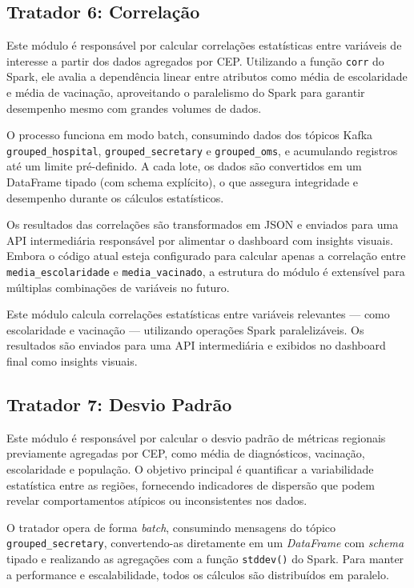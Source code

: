 \documentclass[a4paper,12pt]{article}
\begin{document}
\subsection{Tratador 6: Correlação}

Este módulo é responsável por calcular correlações estatísticas entre variáveis de interesse a partir dos dados agregados por CEP. Utilizando a função \texttt{corr} do Spark, ele avalia a dependência linear entre atributos como média de escolaridade e média de vacinação, aproveitando o paralelismo do Spark para garantir desempenho mesmo com grandes volumes de dados.

O processo funciona em modo batch, consumindo dados dos tópicos Kafka \\ \texttt{grouped\_hospital}, \texttt{grouped\_secretary} e \texttt{grouped\_oms}, e acumulando registros até um limite pré-definido. A cada lote, os dados são convertidos em um DataFrame tipado (com schema explícito), o que assegura integridade e desempenho durante os cálculos estatísticos.

Os resultados das correlações são transformados em JSON e enviados para uma API intermediária responsável por alimentar o dashboard com insights visuais. Embora o código atual esteja configurado para calcular apenas a correlação entre \texttt{media\_escolaridade} e \texttt{media\_vacinado}, a estrutura do módulo é extensível para múltiplas combinações de variáveis no futuro.







Este módulo calcula correlações estatísticas entre variáveis relevantes — como escolaridade e vacinação — utilizando operações Spark paralelizáveis. Os resultados são enviados para uma API intermediária e exibidos no dashboard final como insights visuais.


\subsection{Tratador 7: Desvio Padrão}

Este módulo é responsável por calcular o desvio padrão de métricas regionais previamente agregadas por CEP, como média de diagnósticos, vacinação, escolaridade e população. O objetivo principal é quantificar a variabilidade estatística entre as regiões, fornecendo indicadores de dispersão que podem revelar comportamentos atípicos ou inconsistentes nos dados.

O tratador opera de forma \textit{batch}, consumindo mensagens do tópico  \\ \texttt{grouped\_secretary}, convertendo-as diretamente em um \textit{DataFrame} com \textit{schema} tipado e realizando as agregações com a função \texttt{stddev()} do Spark. Para manter a performance e escalabilidade, todos os cálculos são distribuídos em paralelo.
\end{document}
